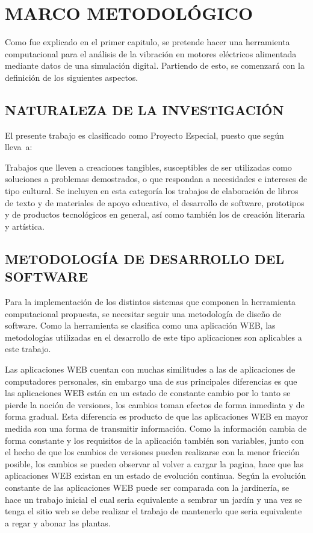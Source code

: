 \thispagestyle{empty}

\section{MARCO METODOLÓGICO}

Como fue explicado en el primer capitulo, se pretende hacer una herramienta
computacional para el análisis de la vibración en motores eléctricos alimentada
mediante datos de una simulación digital. Partiendo de esto, se comenzará
con la definición de los siguientes aspectos.

\subsection{NATURALEZA DE LA INVESTIGACIÓN}

El presente trabajo es clasificado como Proyecto Especial, puesto que según
\textcite{Hernandez} lleva~a:

\begin{center}
    \parbox[ht]{13.5 cm}{Trabajos que lleven a creaciones tangibles,
    susceptibles de ser utilizadas como soluciones a problemas demostrados, o
    que respondan a necesidades e intereses de tipo cultural. Se incluyen en
    esta categoría los trabajos de elaboración de libros de texto y de
    materiales de apoyo educativo, el desarrollo de software, prototipos y de
    productos tecnológicos en general, así como también los de creación
    literaria y artística.}
\end{center}

\subsection*{METODOLOGÍA DE DESARROLLO DEL SOFTWARE}

Para la implementación de los distintos sistemas que componen la herramienta
computacional propuesta, se necesitar seguir una metodología de diseño de
software. Como la herramienta se clasifica como una aplicación WEB, las
metodologías utilizadas en el desarrollo de este tipo aplicaciones son
aplicables a este trabajo.

Las aplicaciones WEB cuentan con muchas similitudes a las de aplicaciones de
computadores personales, sin embargo una de sus principales diferencias es que
las aplicaciones WEB están en un estado de constante cambio por lo tanto
se pierde la noción de versiones, los cambios toman efectos de forma inmediata
y de forma gradual. Esta diferencia es producto de que las aplicaciones WEB
en mayor medida son una forma de transmitir información. Como la información
cambia de forma constante y los requisitos de la aplicación también son
variables, junto con el hecho de que los cambios de versiones pueden
realizarse con la menor fricción posible, los cambios se pueden observar
al volver a cargar la pagina, hace que las aplicaciones WEB existan en un
estado de evolución continua. Según \cite{pressman2002} la evolución constante
de las aplicaciones WEB puede ser comparada con la jardinería, se hace un
trabajo inicial el cual seria equivalente a sembrar un jardín y una vez se
tenga el sitio web se debe realizar el trabajo de mantenerlo que seria
equivalente a regar y abonar las plantas.

